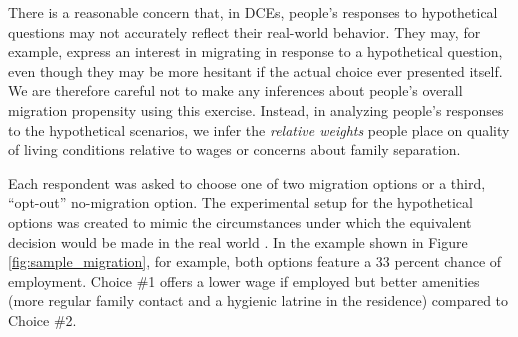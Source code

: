 \documentclass[12pt,pdftex]{article}
\begin{document}
There is a reasonable concern that, in DCEs, people's responses to hypothetical questions may not accurately reflect their real-world behavior. They may, for example, express an interest in migrating in response to a hypothetical question, even though they may be more hesitant if the actual choice ever presented itself. We are therefore careful not to make any inferences about people's overall migration propensity using this exercise. Instead, in analyzing people's responses to the hypothetical scenarios, we infer the \emph{relative weights} people place on quality of living conditions relative to wages or concerns about family separation.



Each respondent was asked to choose one of two migration options or a third, ``opt-out'' no-migration option. The experimental setup for the hypothetical options was created to mimic the circumstances under which the equivalent decision would be made in the real world \citep{Ryan2004}. In the example shown in Figure \ref{fig:sample_migration}, for example, both options feature a 33 percent chance of employment. Choice \#1 offers a lower wage if employed but better amenities (more regular family contact and a hygienic latrine in the residence) compared to Choice \#2.
\end{document}
